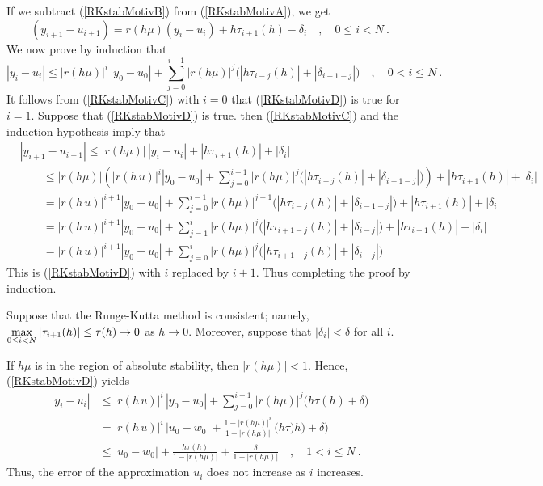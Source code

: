 \begin{rmk}
If we subtract (\ref{RKstabMotivB}) from (\ref{RKstabMotivA}), we get
\begin{equation}\label{RKstabMotivC}
  (y_{i+1}-u_{i+1}) = r(h\mu) (y_i-u_i) + h\tau_{i+1}(h) - \delta_i \quad ,
\quad 0\leq i < N \ .
\end{equation}
We now prove by induction that
\begin{equation}\label{RKstabMotivD}
|y_i-u_i| \leq |r(h\mu)|^i\, |y_0-u_0| + \sum_{j=0}^{i-1}
|r(h\mu)|^j \big( |h\tau_{i-j}(h)| + |\delta_{i-1-j}|\big) \quad ,
\quad 0 < i \leq N \ .
\end{equation}
It follows from (\ref{RKstabMotivC}) with $i=0$ that
(\ref{RKstabMotivD}) is true for $i=1$.  Suppose that (\ref{RKstabMotivD})
is true. then (\ref{RKstabMotivC}) and the induction hypothesis imply that
\begin{align*}
&|y_{i+1}-u_{i+1}| \leq |r(h\mu)|\,|y_i-u_i| + |h\tau_{i+1}(h)| + |\delta_i| \\
&\qquad
\leq |r(h\mu)| \left(|r(h\,u)|^i |y_0-u_0| + \sum_{j=0}^{i-1}
|r(h\mu)|^j \big( |h\tau_{i-j}(h)| + |\delta_{i-1-j}|\big) \right)
+ |h \tau_{i+1}(h)| + |\delta_i| \\
&\qquad = |r(h\,u)|^{i+1} |y_0-u_0| + \sum_{j=0}^{i-1}
|r(h\mu)|^{j+1} \big(|h\tau_{i-j}(h)| + |\delta_{i-1-j}|\big)
+ |h\tau_{i+1}(h)| + |\delta_i| \\
&\qquad = |r(h\,u)|^{i+1} |y_0-u_0| + \sum_{j=1}^i
|r(h\mu)|^j \big(|h\tau_{i+1-j}(h)| + |\delta_{i-j}|\big)
+ |h\tau_{i+1}(h)| + |\delta_i| \\
&\qquad = |r(h\,u)|^{i+1} |y_0-u_0| + \sum_{j=0}^i
|r(h\mu)|^j \big(|h\tau_{i+1-j}(h)| + |\delta_{i-j}|\big)
\end{align*}
This is (\ref{RKstabMotivD}) with $i$ replaced by $i+1$.  Thus completing
the proof by induction.

Suppose that the Runge-Kutta method is consistent; namely,
$\displaystyle \max_{0\leq i <N} |\tau_{i+1}(h)| \leq \tau(h) \to 0$
as $h\to 0$.  Moreover, suppose that $|\delta_i| < \delta$ for all $i$.

If $h\mu$ is in the region of absolute stability, then $|r(h\mu)|<1$.
Hence, (\ref{RKstabMotivD}) yields
\begin{align*}
|y_i-u_i| &\leq |r(h\,u)|^i\, |y_0-u_0| +
\sum_{j=0}^{i-1} |r(h\mu)|^j \big( h\tau(h) + \delta \big) \\
&= |r(h\,u)|^i\, |u_0-w_0| + \frac{1 - |r(h\mu)|^i}{1-|r(h\mu)|}\,
\big( h\tau)h) + \delta \big) \\
&\leq |u_0-w_0| + \frac{h\tau(h)}{1-|r(h\mu)|} + \frac{\delta}{1-|r(h\mu)|}
\quad , \quad 1<i \leq N \ .
\end{align*}
Thus, the error of the approximation $u_i$ does not increase as $i$
increases.


\end{rmk}
